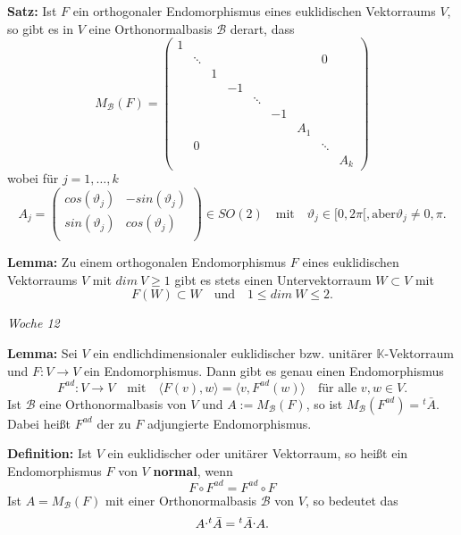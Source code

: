 \documentclass{article}
\let\oldcdot\cdot
\renewcommand{\cdot}{\raisebox{0.1ex}{$\oldcdot$}}
\begin{document}
\textbf{Satz:} Ist $F$ ein orthogonaler Endomorphismus eines euklidischen
Vektorraums $V$, so gibt es in $V$ eine Orthonormalbasis $\mathcal{B}$ derart,
dass
\begin{equation*}
	M_\mathcal{B}(F)=
	\begin{pmatrix}
		1\\
		& \ddots&&&&&&0\\
		&& 1\\
		&&& -1\\
		&&&& \ddots\\
		&&&&& -1\\
		&&&&&& A_1\\
		&0&&&&&& \ddots\\
		&&&&&&&& A_k
	\end{pmatrix}
\end{equation*}
wobei für $j=1,\dots,k$
\begin{equation*}
	A_j=
	\begin{pmatrix}
		cos(\vartheta_j) & -sin(\vartheta_j)\\
		sin(\vartheta_j) & cos(\vartheta_j)\\
	\end{pmatrix}\in SO(2)\quad
	\text{mit}\quad\vartheta_j\in[0,2\pi[,
	\text{aber}\vartheta_j\neq0,\pi.
\end{equation*}

\textbf{Lemma:} Zu einem orthogonalen Endomorphismus $F$ eines euklidischen
Vektorraums $V$ mit $dim\ V\geq1$ gibt es stets einen Untervektorraum $W\subset
V$ mit
\begin{equation*}
	F(W)\subset W\quad\text{und}\quad1\leq dim\ W\leq2.
\end{equation*}

\textit{\small \hspace{-1.5cm}Woche 12}

\textbf{Lemma:} Sei $V$ ein endlichdimensionaler euklidischer bzw. unitärer
$\mathbb{K}$-Vektorraum und $F:V\to V$ ein Endomorphismus. Dann gibt es genau
einen Endomorphismus
\begin{equation*}
	F^{ad}:V\to V\quad\text{mit}\quad \langle F(v),w\rangle=\langle
	v,F^{ad}(w)\rangle\quad \text{für alle } v,w\in V.
\end{equation*}
Ist $\mathcal{B}$ eine Orthonormalbasis von $V$ und $A:=M_\mathcal{B}(F)$, so
ist $M_\mathcal{B}(F^{ad})={^t\bar A}$. Dabei heißt $F^{ad}$ der zu $F$
adjungierte Endomorphismus.

\textbf{Definition:} Ist $V$ ein euklidischer oder unitärer Vektorraum, so
heißt ein Endomorphismus $F$ von $V$ \textbf{normal}, wenn
\begin{equation*}
	F\circ F^{ad}=F^{ad}\circ F
\end{equation*}
Ist $A=M_\mathcal{B}(F)$ mit einer Orthonormalbasis $\mathcal{B}$ von $V$, so
bedeutet das
\begin{equation*}
	A\cdot {^t\bar A}= {^t\bar A}\cdot A.
\end{equation*}
\end{document}
